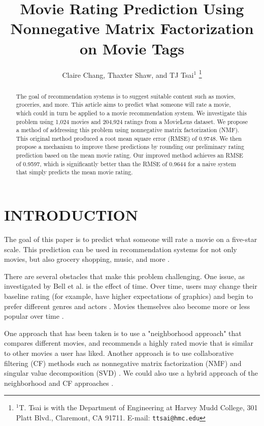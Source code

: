 \documentclass[letterpaper, 10 pt, conference]{ieeeconf}  %
\title{\LARGE \bf
Movie Rating Prediction Using Nonnegative Matrix Factorization on Movie Tags
}
\author{Claire Chang, Thaxter Shaw, and TJ Tsai$^{1}$%
\thanks{$^{1}$T. Tsai is with the Department of Engineering at Harvey Mudd College,
301 Platt Blvd., Claremont, CA 91711. E-mail: {\tt\small ttsai@hmc.edu}}%
}
\begin{document}
\maketitle
\thispagestyle{empty}
\pagestyle{empty}


\begin{abstract}

The goal of recommendation systems is to suggest suitable content such as movies, groceries, and more. This article aims to predict what someone will rate a movie, which could in turn be applied to a movie recommendation system.
We investigate this problem using 1,024 movies and 204,924 ratings from a MovieLens dataset.
We propose a method of addressing this problem using nonnegative matrix factorization (NMF). This original method produced a root mean square error (RMSE) of 0.9748. We then propose a mechanism to improve these predictions by rounding our preliminary rating prediction based on the mean movie rating.
Our improved method achieves an RMSE of 0.9597, which is significantly better than the RMSE of 0.9644 for a naive system that simply predicts the mean movie rating.

\end{abstract}


\section{INTRODUCTION}

The goal of this paper is to predict what someone will rate a movie on a five-star scale.
This prediction can be used in recommendation systems for not only movies, but also grocery shopping, music, and more \cite{recsys}.

There are several obstacles that make this problem challenging. 
One issue, as investigated by Bell et al. is the effect of time. Over time, users may change their baseline rating (for example, have higher expectations of graphics) and begin to prefer different genres and actors \cite{netflix}.
Movies themselves also become more or less popular over time \cite{netflix}.

One approach that has been taken is to use a "neighborhood approach" that compares different movies, and recommends a highly rated movie that is similar to other movies a user has liked. 
Another approach is to use collaborative filtering (CF) methods such as nonnegative matrix factorization (NMF) and singular value decomposition (SVD) \cite{cf}. 
We could also use a hybrid approach of the neighborhood and CF approaches \cite{hybrid}.
\end{document}
